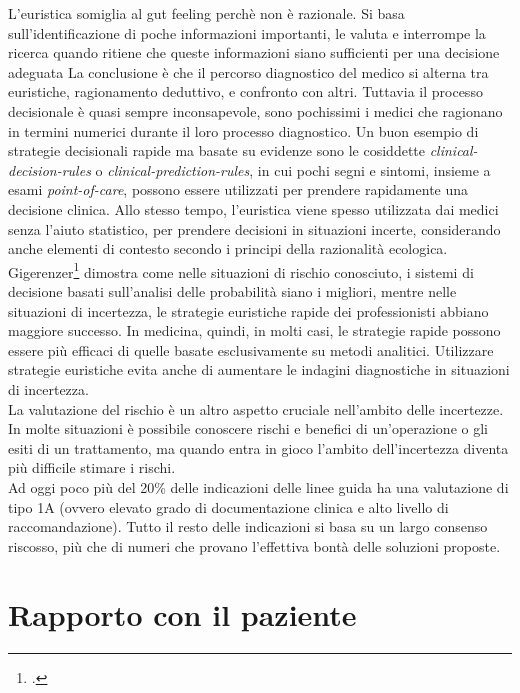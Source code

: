 L'euristica somiglia al gut feeling perchè non è razionale. Si basa sull'identificazione di poche informazioni importanti, le valuta e interrompe la ricerca quando ritiene che queste informazioni siano sufficienti per una decisione adeguata 
La conclusione è che il percorso diagnostico del medico si alterna tra euristiche, ragionamento deduttivo, e confronto con altri. Tuttavia il processo decisionale è quasi sempre inconsapevole, sono pochissimi i medici che ragionano in termini numerici durante il loro processo diagnostico.
Un buon esempio di strategie decisionali rapide ma basate su evidenze sono le cosiddette \textit{\gls{clinical-decision-rules}} o \textit{\gls{clinical-prediction-rules}}, in cui pochi segni e sintomi, insieme a esami \textit{\gls{point-of-care}}, possono essere utilizzati per prendere rapidamente una decisione clinica. Allo stesso tempo, l'euristica viene spesso utilizzata dai medici senza l'aiuto statistico, per prendere decisioni in situazioni incerte, considerando anche elementi di contesto secondo i principi della razionalità ecologica.\\

Gigerenzer\footcite{womak:gigerenzer-euristiche} dimostra come nelle situazioni di rischio conosciuto, i sistemi di decisione basati sull'analisi delle probabilità siano i migliori, mentre nelle situazioni di incertezza, le strategie euristiche rapide dei professionisti abbiano maggiore successo. In medicina, quindi, in molti casi, le strategie rapide possono essere più efficaci di quelle basate esclusivamente su metodi analitici. Utilizzare strategie euristiche evita anche di aumentare le indagini diagnostiche in situazioni di incertezza.\\

La valutazione del rischio è un altro aspetto cruciale nell'ambito delle incertezze. In molte situazioni è possibile conoscere rischi e benefici di un'operazione o gli esiti di un trattamento, ma quando entra in gioco l'ambito dell'incertezza diventa più difficile stimare i rischi. \\
Ad oggi poco più del 20\% delle indicazioni delle linee guida ha una valutazione di tipo 1A (ovvero elevato grado di documentazione clinica e alto livello di raccomandazione). Tutto il resto delle indicazioni si basa su un largo consenso riscosso, più che di numeri che provano l'effettiva bontà delle soluzioni proposte. 


\section{Rapporto con il paziente}

